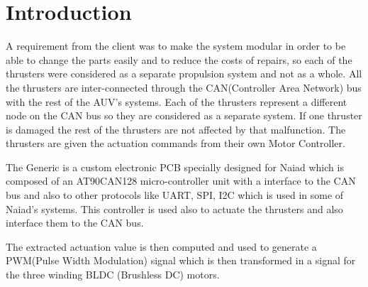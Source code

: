 \section{Introduction}\label{sec:introduction}
A requirement from the client was to make the system modular in order to be able to change the parts easily and to reduce the costs of repairs, so each of the thrusters were  considered as a separate propulsion system and not as a whole. All the thrusters are inter-connected through the CAN(Controller Area Network) bus with the rest of the AUV's systems. Each of the thrusters represent a different node on the CAN bus so they are considered as a separate system. If one thruster is damaged the rest of the thrusters are not affected by that malfunction. The thrusters are given the actuation commands from their own Motor Controller. 

The Generic is a custom electronic PCB specially designed for Naiad which is composed of an AT90CAN128 micro-controller unit with a interface to the CAN bus and also to other protocols like UART, SPI, I2C which is used in some of Naiad's systems. This controller is used also to actuate the thrusters and also interface them to the CAN bus.  

The extracted actuation value is then computed and used to generate a PWM(Pulse Width Modulation) signal which is then transformed in a signal for the three winding BLDC (Brushless DC) motors. 


